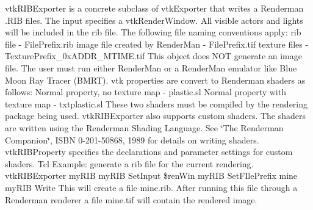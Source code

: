 vtk\-R\-I\-B\-Exporter is a concrete subclass of vtk\-Exporter that writes a Renderman .R\-I\-B files. The input specifies a vtk\-Render\-Window. All visible actors and lights will be included in the rib file. The following file naming conventions apply\-: rib file -\/ File\-Prefix.\-rib image file created by Render\-Man -\/ File\-Prefix.\-tif texture files -\/ Texture\-Prefix\-\_\-0x\-A\-D\-D\-R\-\_\-\-M\-T\-I\-M\-E.\-tif This object does N\-O\-T generate an image file. The user must run either Render\-Man or a Render\-Man emulator like Blue Moon Ray Tracer (B\-M\-R\-T). vtk properties are convert to Renderman shaders as follows\-: Normal property, no texture map -\/ plastic.\-sl Normal property with texture map -\/ txtplastic.\-sl These two shaders must be compiled by the rendering package being used. vtk\-R\-I\-B\-Exporter also supports custom shaders. The shaders are written using the Renderman Shading Language. See \char`\"{}\-The Renderman
 Companion\char`\"{}, I\-S\-B\-N 0-\/201-\/50868, 1989 for details on writing shaders. vtk\-R\-I\-B\-Property specifies the declarations and parameter settings for custom shaders. Tcl Example\-: generate a rib file for the current rendering. vtk\-R\-I\-B\-Exporter my\-R\-I\-B my\-R\-I\-B Set\-Input \$ren\-Win my\-R\-I\-B Set\-F\-Ile\-Prefix mine my\-R\-I\-B Write This will create a file mine.\-rib. After running this file through a Renderman renderer a file mine.\-tif will contain the rendered image.

